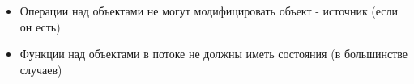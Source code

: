\begin{frame}
\frametitle{\insertsection} 
\framesubtitle{\insertsubsection}
\begin{itemize}
	\item Операции над объектами не могут модифицировать объект - источник (если он есть)
	\item Функции над объектами в потоке не должны иметь состояния (в большинстве случаев)
\end{itemize}
\end{frame}